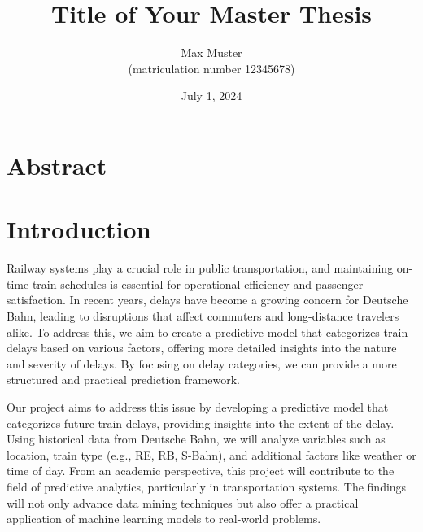 \documentclass[a4paper,oneside,bibliography=totoc]{scrbook}
\begin{document}
    \frontmatter \subject{Master Thesis} %
    \title{Title of Your Master Thesis}
    \author{Max Muster\\
    (matriculation number 12345678)} \date{July 1, 2024}
    \publishers{{\small Submitted to}\\
    Data and Web Science Group\\
    Prof.\ Dr.\ Right-Name-Here\\
    University of Mannheim\\}
    \maketitle


    \chapter{Abstract}

    \begingroup%
    \hypersetup{hidelinks}%
    \tableofcontents%
    \endgroup



    \mainmatter


    \chapter{Introduction}
    \label{ch:intro}

    Railway systems play a crucial role in public transportation, and maintaining on-time train schedules is essential for operational efficiency and passenger satisfaction. In recent years, delays have become a growing concern for Deutsche Bahn, leading to disruptions that affect commuters and long-distance travelers alike. To address this, we aim to create a predictive model that categorizes train delays based on various factors, offering more detailed insights into the nature and severity of delays. By focusing on delay categories, we can provide a more structured and practical prediction framework.

    Our project aims to address this issue by developing a predictive model that categorizes future train delays, providing insights into the extent of the delay. Using historical data from Deutsche Bahn, we will analyze variables such as location, train type (e.g., RE, RB, S-Bahn), and additional factors like weather or time of day. From an academic perspective, this project will contribute to the field of predictive analytics, particularly in transportation systems. The findings will not only advance data mining techniques but also offer a practical application of machine learning models to real-world problems.
\end{document}

